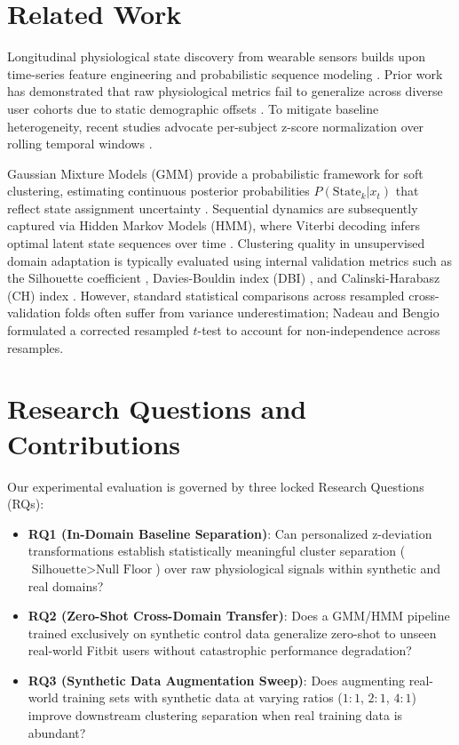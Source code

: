 \documentclass[conference]{IEEEtran}
\begin{document}
\section{Related Work}
Longitudinal physiological state discovery from wearable sensors builds upon time-series feature engineering and probabilistic sequence modeling \cite{smuck2021}. Prior work has demonstrated that raw physiological metrics fail to generalize across diverse user cohorts due to static demographic offsets \cite{sano2018}. To mitigate baseline heterogeneity, recent studies advocate per-subject z-score normalization over rolling temporal windows \cite{dunn2021}.

Gaussian Mixture Models (GMM) provide a probabilistic framework for soft clustering, estimating continuous posterior probabilities $P(\text{State}_k | x_t)$ that reflect state assignment uncertainty \cite{reynolds2009}. Sequential dynamics are subsequently captured via Hidden Markov Models (HMM), where Viterbi decoding infers optimal latent state sequences over time \cite{rabiner1989}. Clustering quality in unsupervised domain adaptation is typically evaluated using internal validation metrics such as the Silhouette coefficient \cite{rousseeuw1987}, Davies-Bouldin index (DBI) \cite{davies1979}, and Calinski-Harabasz (CH) index \cite{calinski1974}. However, standard statistical comparisons across resampled cross-validation folds often suffer from variance underestimation; Nadeau and Bengio \cite{nadeau2003} formulated a corrected resampled $t$-test to account for non-independence across resamples.

\section{Research Questions and Contributions}
Our experimental evaluation is governed by three locked Research Questions (RQs):
\begin{itemize}
    \item \textbf{RQ1 (In-Domain Baseline Separation)}: Can personalized z-deviation transformations establish statistically meaningful cluster separation ($\text{Silhouette} > \text{Null Floor}$) over raw physiological signals within synthetic and real domains?
    \item \textbf{RQ2 (Zero-Shot Cross-Domain Transfer)}: Does a GMM/HMM pipeline trained exclusively on synthetic control data generalize zero-shot to unseen real-world Fitbit users without catastrophic performance degradation?
    \item \textbf{RQ3 (Synthetic Data Augmentation Sweep)}: Does augmenting real-world training sets with synthetic data at varying ratios ($1:1$, $2:1$, $4:1$) improve downstream clustering separation when real training data is abundant?
\end{itemize}
\end{document}
